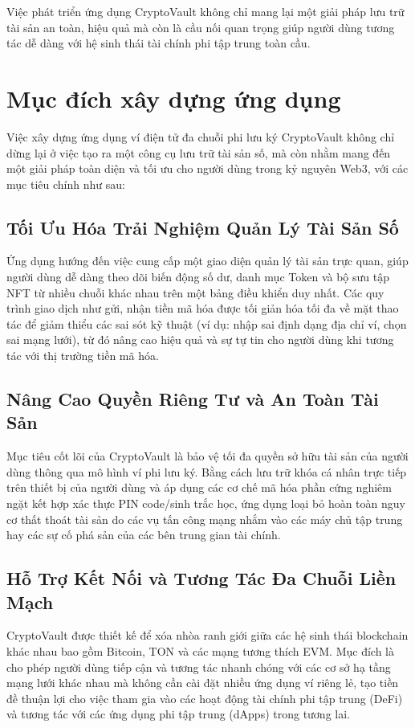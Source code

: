 \documentclass[a4paper]{report}
\begin{document}
Việc phát triển ứng dụng CryptoVault không chỉ mang lại một giải pháp lưu trữ tài sản an toàn, hiệu quả mà còn là cầu nối quan trọng giúp người dùng tương tác dễ dàng với hệ sinh thái tài chính phi tập trung toàn cầu.

\section{Mục đích xây dựng ứng dụng}

Việc xây dựng ứng dụng ví điện tử đa chuỗi phi lưu ký CryptoVault không chỉ dừng lại ở việc tạo ra một công cụ lưu trữ tài sản số, mà còn nhằm mang đến một giải pháp toàn diện và tối ưu cho người dùng trong kỷ nguyên Web3, với các mục tiêu chính như sau:

\subsection{Tối Ưu Hóa Trải Nghiệm Quản Lý Tài Sản Số}
Ứng dụng hướng đến việc cung cấp một giao diện quản lý tài sản trực quan, giúp người dùng dễ dàng theo dõi biến động số dư, danh mục Token và bộ sưu tập NFT từ nhiều chuỗi khác nhau trên một bảng điều khiển duy nhất. Các quy trình giao dịch như gửi, nhận tiền mã hóa được tối giản hóa tối đa về mặt thao tác để giảm thiểu các sai sót kỹ thuật (ví dụ: nhập sai định dạng địa chỉ ví, chọn sai mạng lưới), từ đó nâng cao hiệu quả và sự tự tin cho người dùng khi tương tác với thị trường tiền mã hóa.

\subsection{Nâng Cao Quyền Riêng Tư và An Toàn Tài Sản}
Mục tiêu cốt lõi của CryptoVault là bảo vệ tối đa quyền sở hữu tài sản của người dùng thông qua mô hình ví phi lưu ký. Bằng cách lưu trữ khóa cá nhân trực tiếp trên thiết bị của người dùng và áp dụng các cơ chế mã hóa phần cứng nghiêm ngặt kết hợp xác thực PIN code/sinh trắc học, ứng dụng loại bỏ hoàn toàn nguy cơ thất thoát tài sản do các vụ tấn công mạng nhắm vào các máy chủ tập trung hay các sự cố phá sản của các bên trung gian tài chính.

\subsection{Hỗ Trợ Kết Nối và Tương Tác Đa Chuỗi Liền Mạch}
CryptoVault được thiết kế để xóa nhòa ranh giới giữa các hệ sinh thái blockchain khác nhau bao gồm Bitcoin, TON và các mạng tương thích EVM. Mục đích là cho phép người dùng tiếp cận và tương tác nhanh chóng với các cơ sở hạ tầng mạng lưới khác nhau mà không cần cài đặt nhiều ứng dụng ví riêng lẻ, tạo tiền đề thuận lợi cho việc tham gia vào các hoạt động tài chính phi tập trung (DeFi) và tương tác với các ứng dụng phi tập trung (dApps) trong tương lai.
\end{document}
